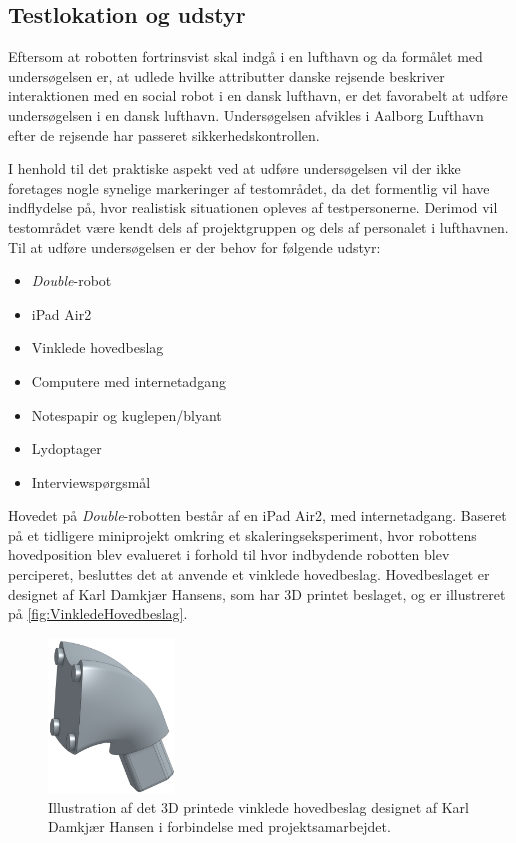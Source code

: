 \subsection*{Testlokation og udstyr}
\label{TestlokationOgUdstyr}
%
Eftersom at robotten fortrinsvist skal indgå i en lufthavn og da formålet med undersøgelsen er, at udlede hvilke attributter danske rejsende beskriver interaktionen med en social robot i en dansk lufthavn, er det favorabelt at udføre undersøgelsen i en dansk lufthavn. Undersøgelsen afvikles i Aalborg Lufthavn efter de rejsende har passeret sikkerhedskontrollen.

I henhold til det praktiske aspekt ved at udføre undersøgelsen vil der ikke foretages nogle synelige markeringer af testområdet, da det formentlig vil have indflydelse på, hvor realistisk situationen opleves af testpersonerne. Derimod vil testområdet være kendt dels af projektgruppen og dels af personalet i lufthavnen. \blankline
%
Til at udføre undersøgelsen er der behov for følgende udstyr:\blankline
%
\begin{itemize}
  \item \textit{Double}-robot
  \item iPad Air2
  \item Vinklede hovedbeslag
  \item Computere med internetadgang
  \item Notespapir og kuglepen/blyant
  \item Lydoptager
  \item Interviewspørgsmål\blankline
\end{itemize}
\noindent
%
Hovedet på \textit{Double}-robotten består af en iPad Air2, med internetadgang. Baseret på et tidligere miniprojekt omkring et skaleringseksperiment, hvor robottens hovedposition blev evalueret i forhold til hvor indbydende robotten blev perciperet, besluttes det at anvende et vinklede hovedbeslag. Hovedbeslaget er designet af Karl Damkjær Hansens, som har 3D printet beslaget, og er illustreret på \autoref{fig:VinkledeHovedbeslag}.            
%
\begin{figure}[H]
\centering
\includegraphics[width = 0.3\textwidth]{Figure/VinkledeHovedbeslag} 
\caption{Illustration af det 3D printede vinklede hovedbeslag designet af Karl Damkjær Hansen i forbindelse med projektsamarbejdet.}
\label{fig:VinkledeHovedbeslag}
\end{figure}
